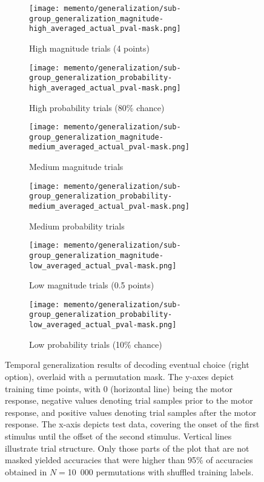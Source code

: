\begin{figure}
	\begin{subfigure}[c]{0.5\textwidth}
		\texttt{[image: memento/generalization/sub-group\_generalization\_magnitude-high\_averaged\_actual\_pval-mask.png]}
		\caption{High magnitude trials (4 points)}
		\label{fig:generalization-mag-high-actual}
	\end{subfigure}
	\begin{subfigure}[c]{0.5\textwidth}
		\texttt{[image: memento/generalization/sub-group\_generalization\_probability-high\_averaged\_actual\_pval-mask.png]}
		\caption{High probability trials (80\% chance)}
		\label{fig:generalization-prob-high-actual}
	\end{subfigure}
	\hfill
	\begin{subfigure}[c]{0.5\textwidth}
		\texttt{[image: memento/generalization/sub-group\_generalization\_magnitude-medium\_averaged\_actual\_pval-mask.png]}
		\caption{Medium magnitude trials}
		\label{fig:generalization-mag-medium-actual}
	\end{subfigure}
	\begin{subfigure}[c]{0.5\textwidth}
		\texttt{[image: memento/generalization/sub-group\_generalization\_probability-medium\_averaged\_actual\_pval-mask.png]}
		\caption{Medium probability trials}
		\label{fig:generalization-prob-medium-actual}
	\end{subfigure}
	\hfill
	\begin{subfigure}[c]{0.5\textwidth}
		\texttt{[image: memento/generalization/sub-group\_generalization\_magnitude-low\_averaged\_actual\_pval-mask.png]}
		\caption{Low magnitude trials (0.5 points)}
		\label{fig:generalization-mag-low-actual}
	\end{subfigure}
	\begin{subfigure}[c]{0.5\textwidth}
		\texttt{[image: memento/generalization/sub-group\_generalization\_probability-low\_averaged\_actual\_pval-mask.png]}
		\caption{Low probability trials (10\% chance)}
		\label{fig:generalization-prob-low-actual}
	\end{subfigure}
	\caption[Temporal generalization: Eventual choice]{Temporal generalization results of decoding eventual choice (right option), overlaid with a permutation mask. The y-axes depict training time points, with 0 (horizontal line) being the motor response, negative values denoting trial samples prior to the motor response, and positive values denoting trial samples after the motor response. The x-axis depicts test data, covering the onset of the first stimulus until the offset of the second stimulus. Vertical lines illustrate trial structure. Only those parts of the plot that are not masked yielded accuracies that were higher than 95\% of accuracies obtained in $N=$10~000 permutations with shuffled training labels.}
	\label{fig:temporal-generalization-actual}
\end{figure}

